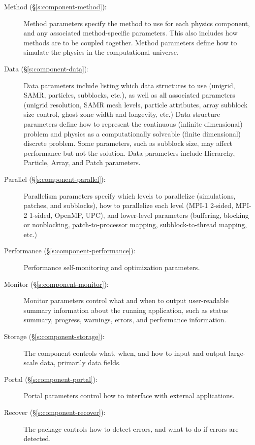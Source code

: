 \begin{description}
 \item [Method (\S\ref{s:component-method}): ] Method parameters specify the
 method to use for each physics component, and any associated
 method-specific parameters.  This also includes how methods are to be
 coupled together.  Method parameters define how to simulate the
 physics in the computational universe.

 \item [Data (\S\ref{s:component-data}): ] Data parameters include listing which
 data structures to use (unigrid, SAMR, particles, subblocks, etc.),
 as well as all associated parameters (unigrid resolution, SAMR mesh
 levels, particle attributes, array subblock size control, ghost zone
 width and longevity, etc.)  Data structure parameters define how to
 represent the continuous (infinite dimensional) problem and physics
 as a computationally solveable (finite dimensional) discrete problem.
 Some parameters, such as subblock size, may affect performance but
 not the solution.  Data parameters include Hierarchy, Particle,
 Array, and Patch parameters.

 \item [Parallel (\S\ref{s:component-parallel}): ] Parallelism parameters
 specify which levels to parallelize (simulations, patches, and
 subblocks), how to parallelize each level (MPI-1 2-sided, MPI-2
 1-sided, OpenMP, UPC), and lower-level parameters (buffering,
 blocking or nonblocking, patch-to-processor mapping,
 subblock-to-thread mapping, etc.)

 \item [Performance (\S\ref{s:component-performance}): ] Performance
 self-monitoring and optimization parameters.

 \item [Monitor (\S\ref{s:component-monitor}): ] Monitor parameters control what
 and when to output user-readable summary information about the
 running application, such as status summary, progress, warnings,
 errors, and performance information.

 \item [Storage (\S\ref{s:component-storage}): ] The 
 component controls what, when, and how to input and output
 large-scale data, primarily data fields.

 \item [Portal (\S\ref{s:component-portal}): ] Portal parameters control
  how to interface with external applications.

 \item [Recover (\S\ref{s:component-recover}): ] The 
 package controls how to detect errors, and what to do if errors are
 detected.

\end{description}

